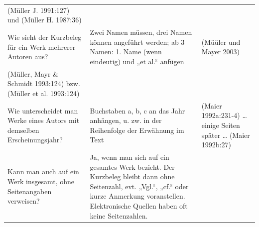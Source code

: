 \documentclass[]{book}
\theoremstyle{definition}
\theoremstyle{definition}
\theoremstyle{definition}
\theoremstyle{remark}
\begin{document}
\begin{longtable}[]{@{}lll@{}}
\begin{minipage}[t]{0.36\columnwidth}
(Müller J. 1991:127) und (Müller H. 1987:36) \vspace{-6mm}\strut
\end{minipage}\tabularnewline
\begin{minipage}[t]{0.18\columnwidth}\raggedright\strut
Wie sieht der Kurzbeleg für ein Werk mehrerer Autoren aus?\strut
\end{minipage} & \begin{minipage}[t]{0.37\columnwidth}\raggedright\strut
Zwei Namen müssen, drei Namen können angeführt werden; ab 3 Namen: 1.
Name (wenn eindeutig) und „et al.`` anfügen\strut
\end{minipage} & \begin{minipage}[t]{0.36\columnwidth}\raggedright\strut
(Müüler und Mayer 2003)\strut
\end{minipage}\tabularnewline
\begin{minipage}[t]{0.18\columnwidth}\raggedright\strut
(Müller, Mayr \& Schmidt 1993:124) bzw. (Müller et al. 1993:124)
\vspace{-6mm}\strut
\end{minipage} & \begin{minipage}[t]{0.37\columnwidth}\raggedright\strut
\strut
\end{minipage}\tabularnewline
\begin{minipage}[t]{0.18\columnwidth}\raggedright\strut
Wie unterscheidet man Werke eines Autors mit demselben
Erscheinungsjahr?\strut
\end{minipage} & \begin{minipage}[t]{0.37\columnwidth}\raggedright\strut
Buchstaben a, b, c an das Jahr anhängen, u. zw. in der Reihenfolge der
Erwähnung im Text\strut
\end{minipage} & \begin{minipage}[t]{0.36\columnwidth}\raggedright\strut
(Maier 1992a:231-4) \ldots{} einige Seiten später \ldots{} (Maier
1992b:27) \vspace{-6mm}\strut
\end{minipage}\tabularnewline
\begin{minipage}[t]{0.18\columnwidth}\raggedright\strut
Kann man auch auf ein Werk insgesamt, ohne Seitenangaben
verweisen?\strut
\end{minipage} & \begin{minipage}[t]{0.37\columnwidth}\raggedright\strut
Ja, wenn man sich auf ein gesamtes Werk bezieht. Der Kurzbeleg bleibt
dann ohne Seitenzahl, evt. „Vgl.``, „cf.`` oder kurze Anmerkung
voranstellen. Elektronische Quellen haben oft keine Seitenzahlen.\strut

\end{minipage}
\end{longtable}
\end{document}
